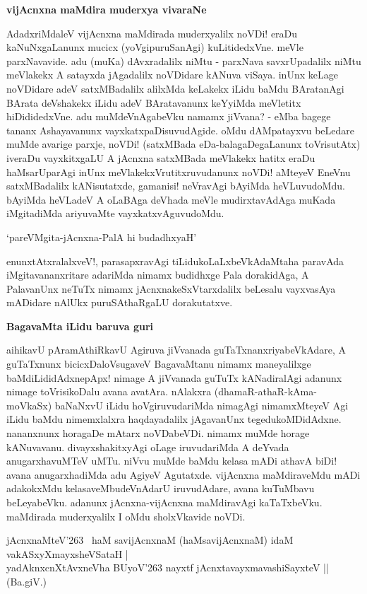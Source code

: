 \noindent
\textbf{vijAcnxna maMdira muderxya vivaraNe}

AdadxriMdaleV vijAcnxna maMdirada muderxyalilx noVDi! eraDu kaNuNxgaLanunx mucicx (yoVgipuruSanAgi) kuLitidedxVne. meVle parxNavavide. adu (muKa) dAvxradalilx niMtu - parxNava savxrUpadalilx niMtu meVlakekx A satayxda jAgadalilx noVDidare kANuva viSaya. inUnx keLage noVDidare adeV satxMBadalilx alilxMda keLakekx iLidu baMdu BAratanAgi BArata deVshakekx iLidu adeV BAratavanunx keYyiMda meVletitx hiDididedxVne. adu muMdeVnAgabeVku namamx jiVvana? - eMba bagege tananx Ashayavanunx vayxkatxpaDisuvudAgide. oMdu dAMpatayxvu beLedare muMde avarige parxje, noVDi! (satxMBada eDa-balagaDegaLanunx toVrisutAtx) iveraDu vayxkitxgaLU A jAcnxna satxMBada meVlakekx hatitx eraDu haMsarUparAgi inUnx meVlakekxVrutitxruvudanunx noVDi! aMteyeV EneVnu satxMBadalilx kANisutatxde, gamanisi! neVravAgi bAyiMda heVLuvudoMdu. bAyiMda heVLadeV A oLaBAga deVhada meVle mudirxtavAdAga muKada iMgitadiMda ariyuvaMte vayxkatxvAguvudoMdu.

\begin{shloka}
`pareVMgita-jAcnxna-PalA hi budadhxyaH'\label{page72}
\end{shloka}

enunxtAtxralalxveV!, parasapxravAgi tiLidukoLaLxbeVkAdaMtaha paravAda iMgitavananxritare adariMda nimamx budidhxge Pala dorakidAga, A PalavanUnx neTuTx nimamx jAcnxnakeSxVtarxdalilx beLesalu vayxvasAya mADidare nAlUkx puruSAthaRgaLU dorakutatxve.

\noindent
\textbf{BagavaMta iLidu baruva guri}\label{page72}

aihikavU pAramAthiRkavU Agiruva jiVvanada guTaTxnanxriyabeVkAdare, A guTaTxnunx bicicxDaloVsugaveV BagavaMtanu nimamx maneyalilxge baMdiLididAdxnepApx! nimage A jiVvanada guTuTx kANadiralAgi adanunx nimage toVrisikoDalu avana avatAra. nAlakxra (dhamaR-athaR-kAma-moVkaSx) baNaNxvU iLidu hoVgiruvudariMda nimagAgi nimamxMteyeV Agi iLidu baMdu nimemxlalxra haqdayadalilx jAgavanUnx tegedukoMDidAdxne. nananxnunx horagaDe mAtarx noVDabeVDi. nimamx muMde horage kANuvavanu. divayxshakitxyAgi oLage iruvudariMda A deYvada anugarxhavuMTeV uMTu. niVvu muMde baMdu kelasa mADi athavA biDi! avana anugarxhadiMda adu AgiyeV Agutatxde. vijAcnxna maMdiraveMdu mADi adakokxMdu kelasaveMbudeVnAdarU iruvudAdare, avana kuTuMbavu beLeyabeVku. adanunx jAcnxna-vijAcnxna maMdiravAgi kaTaTxbeVku. maMdirada muderxyalilx I oMdu sholxVkavide noVDi.

\begin{shloka}
jAcnxnaMteV\char'263 \, haM savijAcnxnaM (haMsavijAcnxnaM) idaM vakASxyXmayxsheVSataH |\\\label{102}
yadAknxcnXtAvxneVha BUyoV\char'263 nayxtf jAcnxtavayxmavashiSayxteV || (Ba.giV.)
\end{shloka}

